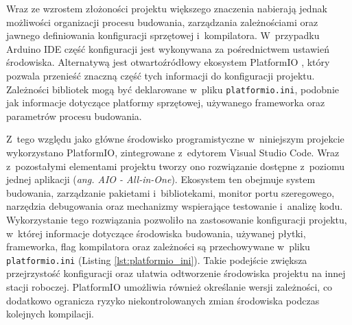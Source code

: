 Wraz ze wzrostem złożoności projektu większego znaczenia nabierają jednak możliwości organizacji procesu budowania, zarządzania zależnościami oraz jawnego definiowania konfiguracji sprzętowej i~kompilatora.
W~przypadku Arduino IDE część konfiguracji jest wykonywana za pośrednictwem ustawień środowiska.
Alternatywą jest otwartoźródłowy ekosystem PlatformIO \cite{platformio}, który pozwala przenieść znaczną część tych informacji do konfiguracji projektu.
Zależności bibliotek mogą być deklarowane w~pliku \texttt{platformio.ini}, podobnie jak informacje dotyczące platformy sprzętowej, używanego frameworka oraz parametrów procesu budowania.

Z~tego względu jako główne środowisko programistyczne w~niniejszym projekcie wykorzystano PlatformIO, zintegrowane z~edytorem Visual Studio Code. Wraz z~pozostałymi elementami projektu tworzy ono rozwiązanie dostępne z~poziomu jednej aplikacji (\textit{ang. AIO - All-in-One}).
Ekosystem ten obejmuje system budowania, zarządzanie pakietami i~bibliotekami, monitor portu szeregowego, narzędzia debugowania oraz mechanizmy wspierające testowanie i~analizę kodu.
Wykorzystanie tego rozwiązania pozwoliło na zastosowanie konfiguracji projektu, w~której informacje dotyczące środowiska budowania, używanej płytki, frameworka, flag kompilatora oraz zależności są przechowywane w~pliku \texttt{platformio.ini} (Listing \ref{lst:platformio_ini}).
Takie podejście zwiększa przejrzystość konfiguracji oraz ułatwia odtworzenie środowiska projektu na innej stacji roboczej.
PlatformIO umożliwia również określanie wersji zależności, co dodatkowo ogranicza ryzyko niekontrolowanych zmian środowiska podczas kolejnych kompilacji.

